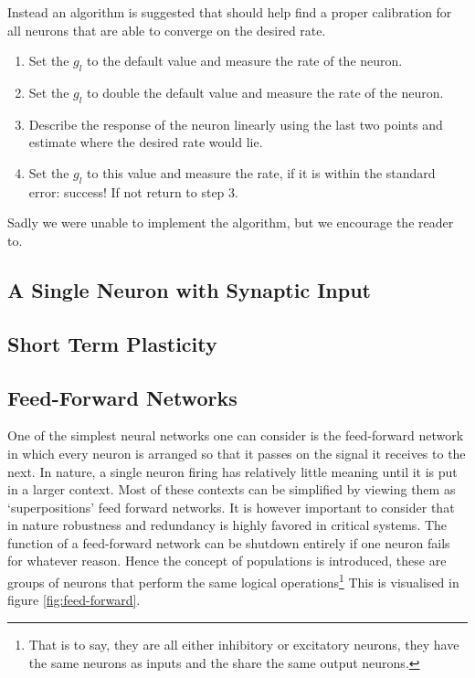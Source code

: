 \documentclass[a4paper,twocolumn]{article}
\begin{document}
Instead an algorithm is suggested that should help find a proper calibration for
all neurons that are able to converge on the desired rate.
\begin{enumerate}
    \item Set the $g_l$ to the default value and measure the rate of the neuron.
    \item Set the $g_l$ to double the default value and measure the rate of the
        neuron.
    \item Describe the response of the neuron linearly using the last two
        points and estimate where the desired rate would lie.
    \item Set the $g_l$ to this value and measure the rate, if it is within the
        standard error: success! If not return to step 3.
\end{enumerate}
Sadly we were unable to implement the algorithm, but we encourage the reader
to.

\subsection{A Single Neuron with Synaptic Input}
\subsection{Short Term Plasticity}

\subsection{Feed-Forward Networks}
\label{sec:feed-forward}

One of the simplest neural networks one can consider is the feed-forward
network in which every neuron is arranged so that it passes on the signal it
receives to the next. In nature, a single neuron firing has relatively little
meaning until it is put in a larger context. Most of these contexts can be
simplified by viewing them as `superpositions' feed forward networks. It is
however important to consider that in nature robustness and redundancy is
highly favored in critical systems. The function of a feed-forward network can
be shutdown entirely if one neuron fails for whatever reason. Hence the concept
of populations is introduced, these are groups of neurons that perform the same
logical operations\footnote{That is to say, they are all either inhibitory or
excitatory neurons, they have the same neurons as inputs and the share the same
output neurons.} This is visualised in figure \ref{fig:feed-forward}.
\end{document}
